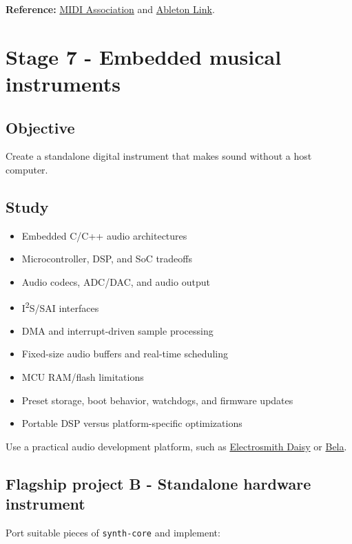 \documentclass[11pt,letterpaper]{article}
\begin{document}
\textbf{Reference:} \href{https://midi.org/midi-2-0}{MIDI Association} and \href{https://www.ableton.com/en/link/}{Ableton Link}.

\clearpage

\section{Stage 7 - Embedded musical instruments}\label{stage-7-embedded-musical-instruments}

\subsection*{Objective}\label{objective-7}

Create a standalone digital instrument that makes sound without a host computer.

\subsection*{Study}\label{study-4}

\begin{itemize}
\item Embedded C/C++ audio architectures
\item Microcontroller, DSP, and SoC tradeoffs
\item Audio codecs, ADC/DAC, and audio output
\item I\textsuperscript{2}S/SAI interfaces
\item DMA and interrupt-driven sample processing
\item Fixed-size audio buffers and real-time scheduling
\item MCU RAM/flash limitations
\item Preset storage, boot behavior, watchdogs, and firmware updates
\item Portable DSP versus platform-specific optimizations
\end{itemize}

Use a practical audio development platform, such as \href{https://docs.daisy.audio/}{Electrosmith Daisy} or \href{https://learn.bela.io/tutorials/}{Bela}.

\subsection*{Flagship project B - Standalone hardware instrument}\label{flagship-project-b-standalone-hardware-instrument}

Port suitable pieces of \texttt{synth-core} and implement:
\end{document}
